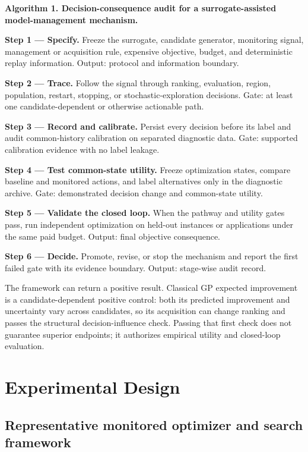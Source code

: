 \documentclass[cmc,article,submit,moreauthors,pdftex]{Definitions/tsp}
\begin{document}
\textbf{Algorithm 1. Decision-consequence audit for a surrogate-assisted model-management mechanism.}

\textbf{Step 1 --- Specify.} Freeze the surrogate, candidate generator, monitoring signal, management or acquisition rule, expensive objective, budget, and deterministic replay information. Output: protocol and information boundary.

\textbf{Step 2 --- Trace.} Follow the signal through ranking, evaluation, region, population, restart, stopping, or stochastic-exploration decisions. Gate: at least one candidate-dependent or otherwise actionable path.

\textbf{Step 3 --- Record and calibrate.} Persist every decision before its label and audit common-history calibration on separated diagnostic data. Gate: supported calibration evidence with no label leakage.

\textbf{Step 4 --- Test common-state utility.} Freeze optimization states, compare baseline and monitored actions, and label alternatives only in the diagnostic archive. Gate: demonstrated decision change and common-state utility.

\textbf{Step 5 --- Validate the closed loop.} When the pathway and utility gates pass, run independent optimization on held-out instances or applications under the same paid budget. Output: final objective consequence.

\textbf{Step 6 --- Decide.} Promote, revise, or stop the mechanism and report the first failed gate with its evidence boundary. Output: stage-wise audit record.

The framework can return a positive result. Classical GP expected improvement is a candidate-dependent positive control: both its predicted improvement and uncertainty vary across candidates, so its acquisition can change ranking and passes the structural decision-influence check. Passing that first check does not guarantee superior endpoints; it authorizes empirical utility and closed-loop evaluation.

\hypertarget{experimental-design}{%
\section{Experimental Design}\label{experimental-design}}

\hypertarget{representative-monitored-optimizer-and-search-framework}{%
\subsection{Representative monitored optimizer and search framework}\label{representative-monitored-optimizer-and-search-framework}}
\end{document}
